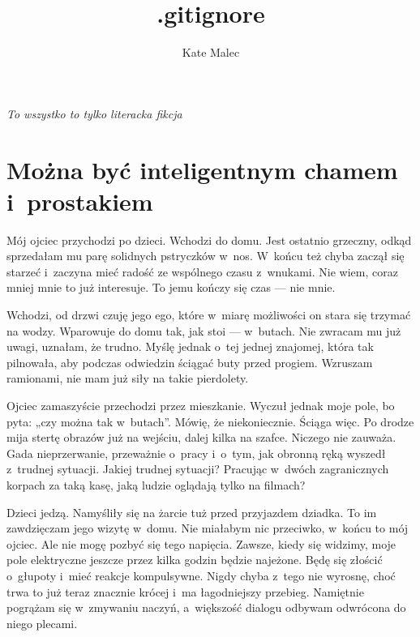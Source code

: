 \documentclass[9pt, a5paper]{memoir}
\title{.gitignore}
\author{Kate Malec}
\date{\the\year}
\begin{document}
\maketitle
\thispagestyle{empty}
\newpage

\thispagestyle{empty}
\vspace*{\fill}
\begin{flushright}
    \itshape
    To wszystko to tylko literacka fikcja
\end{flushright}

\newpage
\tableofcontents
\newpage

\section{Można być inteligentnym chamem i~prostakiem}
Mój ojciec przychodzi po dzieci. Wchodzi do domu. Jest ostatnio grzeczny, odkąd sprzedałam mu parę solidnych pstryczków w~nos. W~końcu też chyba zaczął się starzeć i~zaczyna mieć radość ze wspólnego czasu z~wnukami. Nie wiem, coraz mniej mnie to już interesuje. To jemu kończy się czas --- nie mnie.

Wchodzi, od drzwi czuję jego ego, które w~miarę możliwości on stara się trzymać na wodzy. Wparowuje do domu tak, jak stoi --- w~butach. Nie zwracam mu już uwagi, uznałam, że trudno. Myślę jednak o~tej jednej znajomej, która tak pilnowała, aby podczas odwiedzin ściągać buty przed progiem. Wzruszam ramionami, nie mam już siły na takie pierdolety.

Ojciec zamaszyście przechodzi przez mieszkanie. Wyczuł jednak moje pole, bo pyta: „czy można tak w~butach”. Mówię, że niekoniecznie. Ściąga więc. Po drodze mija stertę obrazów już na wejściu, dalej kilka na szafce. Niczego nie zauważa. Gada nieprzerwanie, przeważnie o~pracy i~o~tym, jak obronną ręką wyszedł z~trudnej sytuacji. Jakiej trudnej sytuacji? Pracując w~dwóch zagranicznych korpach za taką kasę, jaką ludzie oglądają tylko na filmach?

Dzieci jedzą. Namyśliły się na żarcie tuż przed przyjazdem dziadka. To im zawdzięczam jego wizytę w~domu. Nie miałabym nic przeciwko, w~końcu to mój ojciec. Ale nie mogę pozbyć się tego napięcia. Zawsze, kiedy się widzimy, moje pole elektryczne jeszcze przez kilka godzin będzie najeżone. Będę się złościć o~głupoty i~mieć reakcje kompulsywne. Nigdy chyba z~tego nie wyrosnę, choć trwa to już teraz znacznie krócej i~ma łagodniejszy przebieg. Namiętnie pogrążam się w~zmywaniu naczyń, a~większość dialogu odbywam odwrócona do niego plecami.
\end{document}
